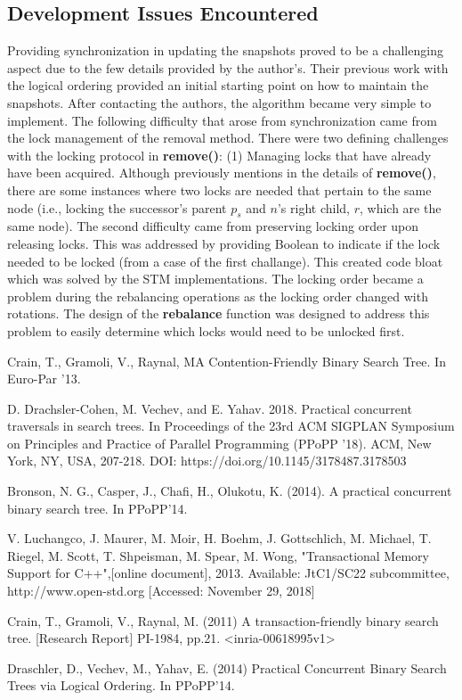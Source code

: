 \documentclass[conference]{IEEEtran}
\theoremstyle{definition}
\theoremstyle{theorem}
\begin{document}
\subsection{Development Issues Encountered}
Providing synchronization in updating the snapshots proved to be a challenging aspect due to the few details provided by the author's. Their previous work with the logical ordering provided an initial starting point on how to maintain the snapshots. After contacting the authors, the algorithm became very simple to implement. The following difficulty that arose from synchronization came from the lock management of the removal method. There were two defining challenges with the locking protocol in \textbf{remove()}: (1) Managing locks that have already have been acquired. Although previously mentions in the details of \textbf{remove()}, there are some instances where two locks are needed that pertain to the same node (i.e., locking the successor's parent $p_s$ and $n$'s right child, $r$, which are the same node). The second difficulty came from preserving locking order upon releasing locks. This was addressed by providing Boolean to indicate if the lock needed to be locked (from a case of the first challange). This created code bloat which was solved by the STM implementations. The locking order became a problem during the rebalancing operations as the locking order changed with rotations. The design of the \textbf{rebalance} function was designed to address this problem to easily determine which locks would need to be unlocked first.

\begin{thebibliography}{00}

Crain, T., Gramoli, V., Raynal, MA Contention-Friendly Binary Search Tree. In Euro-Par '13.

 D. Drachsler-Cohen, M. Vechev, and E. Yahav. 2018. Practical concurrent traversals in search trees. In Proceedings of the 23rd ACM SIGPLAN Symposium on Principles and Practice of Parallel Programming (PPoPP '18). ACM, New York, NY, USA, 207-218. DOI: https://doi.org/10.1145/3178487.3178503

Bronson, N. G., Casper, J., Chafi, H., Olukotu, K. (2014). A practical concurrent binary search tree. In PPoPP'14.

 V. Luchangco, J. Maurer, M. Moir, H. Boehm, J. Gottschlich, M. Michael, T. Riegel, M. Scott, T. Shpeisman, M. Spear, M. Wong, "Transactional Memory Support for C++",[online document], 2013. Available: JtC1/SC22 subcommittee, http://www.open-std.org [Accessed: November 29, 2018]


Crain, T., Gramoli, V., Raynal, M. (2011) A transaction-friendly binary search tree.  [Research Report] PI-1984, pp.21. <inria-00618995v1>

Draschler, D., Vechev, M., Yahav, E. (2014) Practical Concurrent Binary Search Trees via Logical Ordering. In PPoPP'14.
\end{thebibliography}
\end{document}
